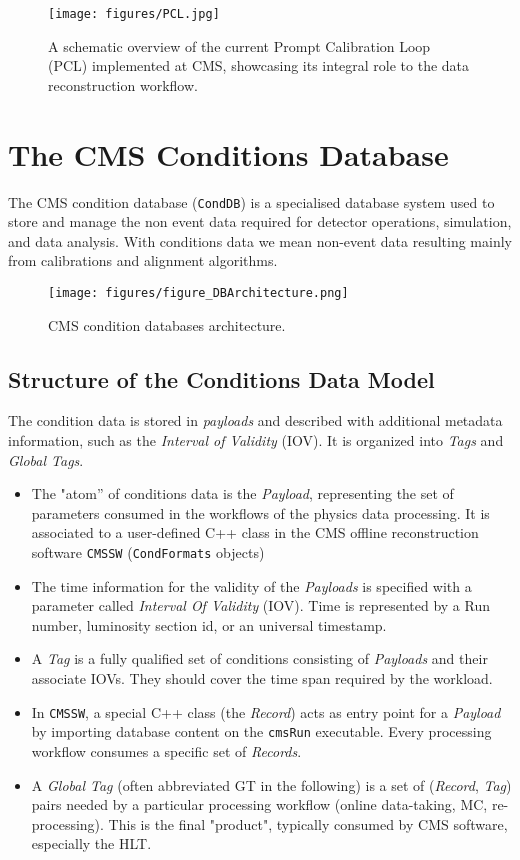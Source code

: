 \begin{figure}[h!]	
\centering
\texttt{[image: figures/PCL.jpg]} %
\caption{A schematic overview of the current Prompt Calibration Loop (PCL) implemented at CMS, showcasing its integral role to the data reconstruction workflow.} %
\label{fig:PCL}
\end{figure}

\section{The CMS Conditions Database} \label{sec:CMS_CondDB}
The CMS condition database (\texttt{CondDB}) is a specialised database system used to store and manage the non event data required for detector operations, simulation, and data analysis. With conditions data we mean non-event data resulting mainly from calibrations and alignment algorithms.

\begin{figure}[h!]	
\centering
\texttt{[image: figures/figure\_DBArchitecture.png]} %
\caption{CMS condition databases architecture. \cite{Gruttola_2010}} 
\label{fig:CondDB}
\end{figure}

\subsection{Structure of the Conditions Data Model}
The condition data is stored in \emph{payloads} and described with additional metadata information, such as the \emph{Interval of
Validity} (IOV). It is organized into \emph{Tags} and \emph{Global Tags}.
\begin{itemize}
\item The "atom” of conditions data is the \emph{Payload}, representing the set of parameters consumed in the workflows of the physics data processing. It is associated to a user-defined C++ class in the CMS offline reconstruction software \texttt{CMSSW} \cite{CMSSW_ref} (\texttt{CondFormats} objects)
\item The time information for the validity of the \emph{Payloads} is specified with a parameter called \emph{Interval Of Validity} (IOV). Time is represented by a Run number, luminosity section id, or an universal timestamp.
\item A \emph{Tag} is a fully qualified set of conditions consisting of
\emph{Payloads} and their associate IOVs. They should cover the time span required by the workload. 
\item In \texttt{CMSSW}, a special C++ class (the \emph{Record}) acts as entry point for a \emph{Payload} by importing database content on the \texttt{cmsRun} executable. Every processing workflow consumes a specific set of \emph{Records}.
\item A \emph{Global Tag} (often abbreviated GT in the following) is a set of (\emph{Record}, \emph{Tag}) pairs needed by a particular processing workflow (online data-taking, MC, re-processing). This is the final "product", typically consumed by CMS software, especially the HLT.
\end{itemize}

